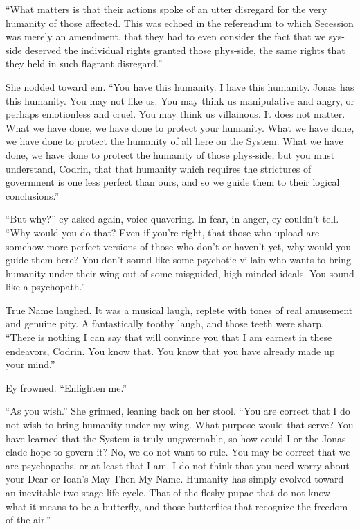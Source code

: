 ``What matters is that their actions spoke of an utter disregard for the very humanity of those affected. This was echoed in the referendum to which Secession was merely an amendment, that they had to even consider the fact that we sys-side deserved the individual rights granted those phys-side, the same rights that they held in such flagrant disregard.''

She nodded toward em. ``You have this humanity. I have this humanity. Jonas has this humanity. You may not like us. You may think us manipulative and angry, or perhaps emotionless and cruel. You may think us villainous. It does not matter. What we have done, we have done to protect your humanity. What we have done, we have done to protect the humanity of all here on the System. What we have done, we have done to protect the humanity of those phys-side, but you must understand, Codrin, that that humanity which requires the strictures of government is one less perfect than ours, and so we guide them to their logical conclusions.''

``But why?'' ey asked again, voice quavering. In fear, in anger, ey couldn't tell. ``Why would you do that? Even if you're right, that those who upload are somehow more perfect versions of those who don't or haven't yet, why would you guide them here? You don't sound like some psychotic villain who wants to bring humanity under their wing out of some misguided, high-minded ideals. You sound like a psychopath.''

True Name laughed. It was a musical laugh, replete with tones of real amusement and genuine pity. A fantastically toothy laugh, and those teeth were sharp. ``There is nothing I can say that will convince you that I am earnest in these endeavors, Codrin. You know that. You know that you have already made up your mind.''

Ey frowned. ``Enlighten me.''

``As you wish.'' She grinned, leaning back on her stool. ``You are correct that I do not wish to bring humanity under my wing. What purpose would that serve? You have learned that the System is truly ungovernable, so how could I or the Jonas clade hope to govern it? No, we do not want to rule. You may be correct that we are psychopaths, or at least that I am. I do not think that you need worry about your Dear or Ioan's May Then My Name. Humanity has simply evolved toward an inevitable two-stage life cycle. That of the fleshy pupae that do not know what it means to be a butterfly, and those butterflies that recognize the freedom of the air.''

